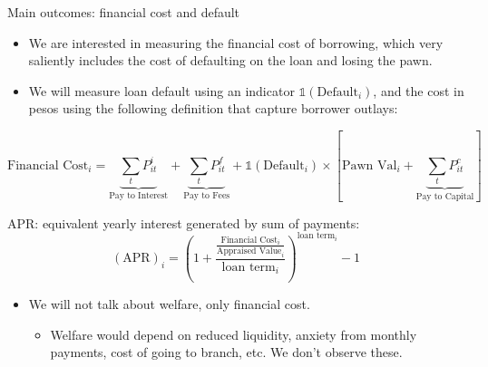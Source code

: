 \documentclass[8pt]{beamer}
\begin{document}
\begin{frame}{Main outcomes: financial cost and default}
\label{fc_outcome}
\begin{itemize}
    \item We are interested in measuring the financial cost of borrowing, which very saliently includes the cost of defaulting on the loan and losing the pawn.
    \item We will measure loan default using an indicator $\mathds{1}(\text{Default}_i)$, and the cost in pesos using the following definition that capture borrower outlays:
\end{itemize}

   \begin{equation*}
    \text{Financial Cost}_i =  \underbrace{\sum_t P^i_{it}}_{\text{Pay to Interest}} + \underbrace{\sum_t P^f_{it}}_{\text{Pay to Fees}}  + \mathds{1}(\text{Default}_i) \times \left[\text{Pawn Val}_i + \underbrace{\sum_t P^c_{it}}_{\text{Pay to Capital}} \right]
   \end{equation*}

\vspace{.2in}
\: \: \: \: APR: equivalent yearly interest generated by sum of payments:
   \begin{equation*}
    (\text{APR})_i =\left( 1 + \frac{\frac{\text{Financial Cost}_i}{\text{Appraised Value}_i}}{\text{loan term}_i}\right)^{\text{loan term}_i}-1 
\end{equation*}

   \vspace{.2in}
\begin{itemize}
    \item We \alert{will not talk about welfare}, only financial cost.
    \begin{itemize}
        \item Welfare would depend on reduced liquidity, anxiety from monthly payments, cost of going to branch, etc. We don't observe these.
    \end{itemize}
\end{itemize}
\end{frame}
\end{document}
